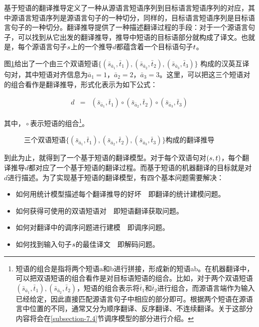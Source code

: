 \parinterval 基于短语的翻译推导定义了一种从源语言短语序列到目标语言短语序列的对应，其中源语言短语序列是源语言句子的一种切分，同样的，目标语言短语序列是目标语言句子的一种切分。翻译推导提供了一种描述翻译过程的手段：对于一个源语言句子，可以找到从它出发的翻译推导，推导中短语的目标语部分就构成了译文。也就是，每个源语言句子${s}$上的一个推导$d$都蕴含着一个目标语句子${t}$。

\parinterval 图\ref{fig:7-10}给出了一个由三个双语短语$\{(\bar{s}_{\bar{a}_1},\bar{t}_1),(\bar{s}_{\bar{a}_2},\bar{t}_2),(\bar{s}_{\bar{a}_3},\bar{t}_3)\}$ 构成的汉英互译句对，其中短语对齐信息为$\bar{a}_1 = 1$，$\bar{a}_2 = 2$，$\bar{a}_3 = 3$。这里，可以把这三个短语对的组合看作是翻译推导，形式化表示为如下公式：

\begin{eqnarray}
d & = & {(\bar{s}_{\bar{a}_1},\bar{t}_1)} \circ {(\bar{s}_{\bar{a}_2},\bar{t}_2)} \circ {(\bar{s}_{\bar{a}_3},\bar{t}_3)}
\label{eq:7-1}
\end{eqnarray}

\noindent 其中，${} \circ $表示短语的组合\footnote[2]{短语的组合是指将两个短语a和b进行拼接，形成新的短语ab。在机器翻译中，可以把双语短语的组合看作是对目标语短语的组合。比如，对于两个双语短语$(\bar{s}_{\bar{a}_1},\bar{t}_1),(\bar{s}_{\bar{a}_2},\bar{t}_2)$，短语的组合表示将$\bar{t}_1$和$\bar{t}_2$进行组合，而源语言端作为输入已经给定，因此直接匹配源语言句子中相应的部分即可。根据两个短语在源语言中位置的不同，通常又分为顺序翻译、反序翻译、不连续翻译。关于这部分内容将会在\ref{subsection-7.4}节调序模型的部分进行介绍。}。

\begin{figure}[htp]
\centering

\caption{三个双语短语$\{(\bar{s}_{\bar{a}_1},\bar{t}_1),(\bar{s}_{\bar{a}_2},\bar{t}_2),(\bar{s}_{\bar{a}_3},\bar{t}_3)\}$构成的翻译推导}
\label{fig:7-10}
\end{figure}

\parinterval 到此为止，就得到了一个基于短语的翻译模型。对于每个双语句对$({s}, {t})$，每个翻译推导$d$都对应了一个基于短语的翻译过程。而基于短语的机器翻译的目标就是对$d$进行描述。为了实现基于短语的翻译模型，有四个基本问题需要解决：

\begin{itemize}
\vspace{0.5em}
\item 如何用统计模型描述每个翻译推导的好坏\ \dash \ 即翻译的统计建模问题。
\vspace{0.5em}
\item 如何获得可使用的双语短语对\ \dash \ 即短语翻译获取问题。
\vspace{0.5em}
\item 如何对翻译中的调序问题进行建模\ \dash \ 即调序问题。
\vspace{0.5em}
\item 如何找到输入句子${s}$的最佳译文\ \dash \ 即解码问题。
\vspace{0.5em}
\end{itemize}

